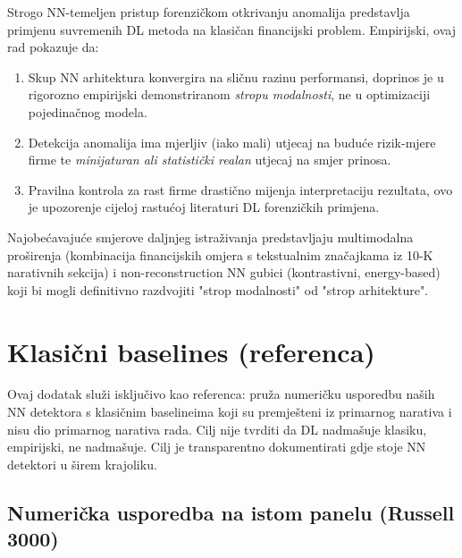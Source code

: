 \documentclass[diplomskirad,authoryear]{fer}
\begin{document}
Strogo NN-temeljen pristup forenzičkom otkrivanju anomalija predstavlja primjenu suvremenih DL metoda na klasičan financijski problem. Empirijski, ovaj rad pokazuje da:
\begin{enumerate}
 \item Skup NN arhitektura konvergira na sličnu razinu performansi, doprinos je u rigorozno empirijski demonstriranom \emph{stropu modalnosti}, ne u optimizaciji pojedinačnog modela.
 \item Detekcija anomalija ima mjerljiv (iako mali) utjecaj na buduće rizik-mjere firme te \emph{minijaturan ali statistički realan} utjecaj na smjer prinosa.
 \item Pravilna kontrola za rast firme drastično mijenja interpretaciju rezultata, ovo je upozorenje cijeloj rastućoj literaturi DL forenzičkih primjena.
\end{enumerate}

Najobećavajuće smjerove daljnjeg istraživanja predstavljaju multimodalna proširenja (kombinacija financijskih omjera s tekstualnim značajkama iz 10-K narativnih sekcija) i non-reconstruction NN gubici (kontrastivni, energy-based) koji bi mogli definitivno razdvojiti "strop modalnosti" od "strop arhitekture".


\backmatter

\chapter{Klasični baselines (referenca)}

Ovaj dodatak služi isključivo kao referenca: pruža numeričku usporedbu naših NN detektora s klasičnim baselineima koji su premješteni iz primarnog narativa i nisu dio primarnog narativa rada. Cilj nije tvrditi da DL nadmašuje klasiku, empirijski, ne nadmašuje. Cilj je transparentno dokumentirati gdje stoje NN detektori u širem krajoliku.

\section{Numerička usporedba na istom panelu (Russell 3000)}
\end{document}
